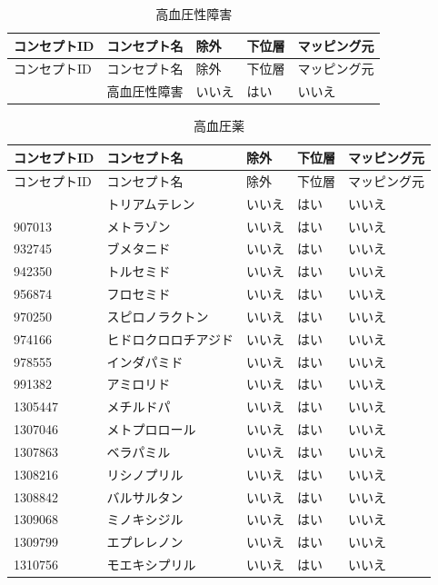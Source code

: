 \documentclass[
  11pt]{book}
\theoremstyle{definition}
\theoremstyle{definition}
\theoremstyle{definition}
\theoremstyle{definition}
\theoremstyle{remark}
\begin{document}
\begin{longtable}[]{@{}lllll@{}}
\caption{\label{tab:hypertensionAceMono} 高血圧性障害}\tabularnewline
\toprule\noalign{}
コンセプトID & コンセプト名 & 除外 & 下位層 & マッピング元 \\
\midrule\noalign{}
\endfirsthead
\toprule\noalign{}
コンセプトID & コンセプト名 & 除外 & 下位層 & マッピング元 \\
\midrule\noalign{}
\endhead
\bottomrule\noalign{}
\endlastfoot
316866 & 高血圧性障害 & いいえ & はい & いいえ \\
\end{longtable}

\begin{longtable}[]{@{}lllll@{}}
\caption{\label{tab:htnDrugsAceMono} 高血圧薬}\tabularnewline
\toprule\noalign{}
コンセプトID & コンセプト名 & 除外 & 下位層 & マッピング元 \\
\midrule\noalign{}
\endfirsthead
\toprule\noalign{}
コンセプトID & コンセプト名 & 除外 & 下位層 & マッピング元 \\
\midrule\noalign{}
\endhead
\bottomrule\noalign{}
\endlastfoot
904542 & トリアムテレン & いいえ & はい & いいえ \\
907013 & メトラゾン & いいえ & はい & いいえ \\
932745 & ブメタニド & いいえ & はい & いいえ \\
942350 & トルセミド & いいえ & はい & いいえ \\
956874 & フロセミド & いいえ & はい & いいえ \\
970250 & スピロノラクトン & いいえ & はい & いいえ \\
974166 & ヒドロクロロチアジド & いいえ & はい & いいえ \\
978555 & インダパミド & いいえ & はい & いいえ \\
991382 & アミロリド & いいえ & はい & いいえ \\
1305447 & メチルドパ & いいえ & はい & いいえ \\
1307046 & メトプロロール & いいえ & はい & いいえ \\
1307863 & ベラパミル & いいえ & はい & いいえ \\
1308216 & リシノプリル & いいえ & はい & いいえ \\
1308842 & バルサルタン & いいえ & はい & いいえ \\
1309068 & ミノキシジル & いいえ & はい & いいえ \\
1309799 & エプレレノン & いいえ & はい & いいえ \\
1310756 & モエキシプリル & いいえ & はい & いいえ \\

\end{longtable}
\end{document}
